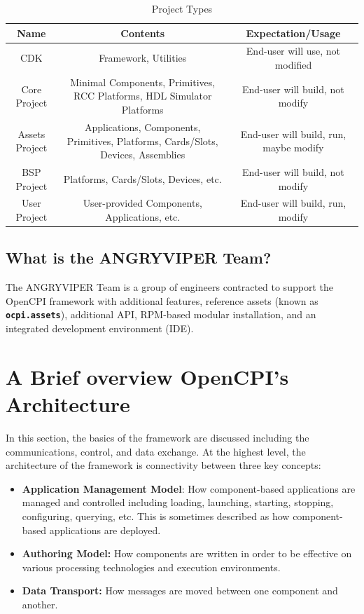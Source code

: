 \begin{center}
\begin{table}[h]
\caption{Project Types}
\begin{tabularx}{\textwidth}{|c|C|C|}
\hline
{}
Name & Contents & Expectation/Usage\\
\hline
CDK & Framework, Utilities & End-user will use, not modified
\\
\hline
Core Project & Minimal Components, Primitives, RCC Platforms, HDL Simulator Platforms & End-user will build, not modify
\\
\hline
Assets Project & Applications, Components, Primitives, Platforms, Cards/Slots, Devices, Assemblies  & End-user will build, run, maybe modify
\\
\hline
BSP Project & Platforms, Cards/Slots, Devices, etc.  & End-user will build, not modify
\\
\hline
User Project & User-provided Components, Applications, etc. & End-user will build, run, modify
\\
\hline
\end{tabularx}
\end{table}
\end{center}

\subsection{What is the ANGRYVIPER Team?}
\label{subsec:what_is_angryviper}
The ANGRYVIPER Team is a group of engineers contracted to support the OpenCPI framework with additional features, reference assets (known as \textbf{\texttt{ocpi.assets}}), additional API, RPM-based modular installation, and an integrated development environment (IDE).

\newpage
\section{A Brief overview OpenCPI's Architecture}
In this section, the basics of the framework are discussed including the communications, control, and data exchange.
\label{sec:brief_ow_arch}
At the highest level, the architecture of the framework is connectivity between three key concepts:
\begin{itemize}
\item \textbf{Application Management Model}: How component-based applications are managed and controlled including loading, launching, starting, stopping, configuring, querying, etc. This is sometimes described as how component-based applications are deployed.
\item \textbf{Authoring Model:} How components are written in order to be effective on various
processing technologies and execution environments.
\item \textbf{Data Transport:} How messages are moved between one component and another.
\end{itemize}

